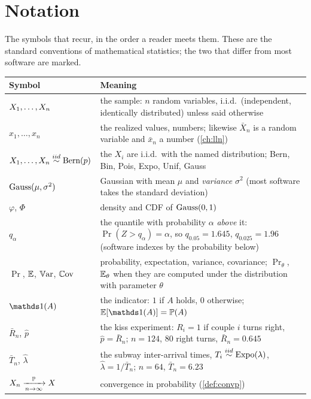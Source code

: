 \chapter{Notation}
\label{ch:notation}

The symbols that recur, in the order a reader meets them.
These are the standard conventions of mathematical statistics; the two that differ from most software are marked.

\begin{small}
\begin{longtable}{@{}>{\raggedright\arraybackslash}p{1.55in}>{\raggedright\arraybackslash}p{4.35in}@{}}
\toprule
Symbol & Meaning \\
\midrule
\endhead
\bottomrule
\endlastfoot
$X_1, \ldots, X_n$ & the sample: $n$ random variables, i.i.d.\ (independent, identically distributed) unless said otherwise \\[2pt]
$x_1, \ldots, x_n$ & the realized values, numbers; likewise $\bar{X}_n$ is a random variable and $\bar{x}_n$ a number (\cref{ch:lln}) \\[2pt]
$X_1, \ldots, X_n \stackrel{iid}{\sim} \text{Bern}(p)$ & the $X_i$ are i.i.d.\ with the named distribution; Bern, Bin, Pois, Expo, Unif, Gauss \\[2pt]
$\text{Gauss}(\mu, \sigma^2)$ & Gaussian with mean $\mu$ and \textit{variance} $\sigma^2$ (most software takes the standard deviation) \\[2pt]
$\varphi$, $\Phi$ & density and CDF of $\text{Gauss}(0,1)$ \\[2pt]
$q_\alpha$ & the quantile with probability $\alpha$ \textit{above} it: $\Pr(Z > q_\alpha) = \alpha$, so $q_{0.05} = 1.645$, $q_{0.025} = 1.96$ (software indexes by the probability below) \\[2pt]
$\Pr$, $\operatorname*{\mathbb{E}}$, $\operatorname*{\mathbb{V}\text{ar}}$, $\operatorname*{\mathbb{C}\text{ov}}$ & probability, expectation, variance, covariance; $\Pr_\theta$, $\operatorname*{\mathbb{E}}_\theta$ when they are computed under the distribution with parameter $\theta$ \\[2pt]
$\ind(A)$ & the indicator: $1$ if $A$ holds, $0$ otherwise; $\E[\ind(A)] = \Pr(A)$ \\[2pt]
$\bar{R}_n$, $\hat{p}$ & the kiss experiment: $R_i = 1$ if couple $i$ turns right, $\hat{p} = \bar{R}_n$; $n = 124$, $80$ right turns, $\bar{R}_n = 0.645$ \\[2pt]
$\bar{T}_n$, $\hat{\lambda}$ & the subway inter-arrival times, $T_i \stackrel{iid}{\sim} \text{Expo}(\lambda)$, $\hat{\lambda} = 1/\bar{T}_n$; $n = 64$, $\bar{T}_n = 6.23$ \\[2pt]
$X_n \xrightarrow [n \to \infty ]{\mathbb{P}} X$ & convergence in probability (\cref{def:convp}) \\[2pt]

\end{longtable}
\end{small}
